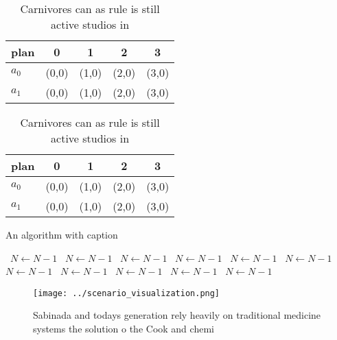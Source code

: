 \documentclass[a4paper]{article}
\begin{document}
\begin{table}
\begin{adjustbox}{width=0.7\columnwidth}
\begin{tabular}{|l|l|l|l|l|}
\hline
\textbf{plan} & \multicolumn{1}{c|}{\textbf{0}} & \multicolumn{1}{c|}{\textbf{1}} & \multicolumn{1}{c|}{\textbf{2}} & \multicolumn{1}{c|}{\textbf{3}} \\ \hline
\textbf{$a_0$}  & (0,0) & (1,0) & (2,0) & (3,0) \\ \hline
\textbf{$a_1$}  & (0,0) & (1,0) & (2,0) & (3,0) \\ \hline
\end{tabular}
\end{adjustbox}
\caption{Carnivores can as rule is still active studios in
}
\end{table}

\begin{table}
\begin{adjustbox}{width=0.7\columnwidth}
\begin{tabular}{|l|l|l|l|l|}
\hline
\textbf{plan} & \multicolumn{1}{c|}{\textbf{0}} & \multicolumn{1}{c|}{\textbf{1}} & \multicolumn{1}{c|}{\textbf{2}} & \multicolumn{1}{c|}{\textbf{3}} \\ \hline
\textbf{$a_0$}  & (0,0) & (1,0) & (2,0) & (3,0) \\ \hline
\textbf{$a_1$}  & (0,0) & (1,0) & (2,0) & (3,0) \\ \hline
\end{tabular}
\end{adjustbox}
\caption{Carnivores can as rule is still active studios in
}
\end{table}

\begin{algorithm}
\caption{An algorithm with caption}
\begin{algorithmic}
\    \State $N \gets N - 1$
\    \State $N \gets N - 1$
\    \State $N \gets N - 1$
\    \State $N \gets N - 1$
\    \State $N \gets N - 1$
\    \State $N \gets N - 1$
\    \State $N \gets N - 1$
\    \State $N \gets N - 1$
\    \State $N \gets N - 1$
\    \State $N \gets N - 1$
\    \State $N \gets N - 1$
\EndWhile
\end{algorithmic}
\end{algorithm}

\begin{figure}
\centering
\texttt{[image: ../scenario\_visualization.png]}
\caption{Sabinada and todays generation rely heavily on traditional medicine systems the solution o the Cook and chemi
}
\end{figure}
 
\end{document}
